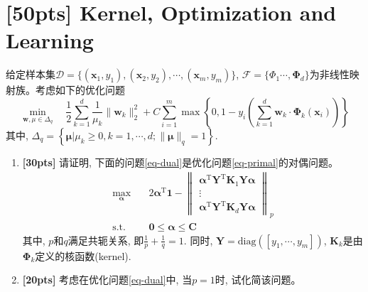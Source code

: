\documentclass[a4paper,UTF8]{article}
\numberwithin{equation}{section}
\theoremstyle{definition}
\begin{document}
\newpage
\section{[50pts] Kernel, Optimization and Learning}
给定样本集$\mathcal{D} = \{(\mathbf{x}_1,y_1),(\mathbf{x}_2,y_2),\cdots,(\mathbf{x}_m,y_m)\}$, $\mathcal{F} = \{\Phi_1 \cdots,\bm \Phi_d\}$为非线性映射族。考虑如下的优化问题
\begin{equation}
\label{eq-primal}
\min_{\mathbf w, \mu\in \Delta_q} \quad \frac{1}{2} \sum_{k=1}^d \frac{1}{\mu_k}\lVert\mathbf w_k\rVert_2^2 + C\sum_{i=1}^m \max\left\lbrace 0,1 - y_i\left(\sum_{k=1}^d \mathbf w_k \cdot \bm \Phi_k(\mathbf{x}_i)\right) \right\rbrace
\end{equation}
其中, $\Delta_q = \left\lbrace \bm{ \mu} | \mu_k\geq 0, k=1,\cdots,d; \lVert \bm{ \mu} \rVert_q = 1\right\rbrace$.

\begin{enumerate}[(1)]
\item{ \textbf{[30pts]} 请证明, 下面的问题\ref{eq-dual}是优化问题\ref{eq-primal}的对偶问题。
\begin{equation}
\label{eq-dual}
	\begin{split}
\max_{\bm \alpha} &\quad 2\bm \alpha^\mathrm T \mathbf{1}- \left\lVert
 \begin{matrix}
   \bm \alpha^\mathrm{T}\mathbf Y^\mathrm{T} \mathbf K_1 \mathbf Y  \bm \alpha \\
   \vdots \\
  \bm \alpha^\mathrm{T}\mathbf Y^\mathrm{T} \mathbf K_d \mathbf Y  \bm \alpha 
  \end{matrix}
  \right\rVert_p\\
  \text{s.t.} &\quad  \mathbf{0} \leq \bm \alpha  \leq \mathbf{C} 
  \end{split}
\end{equation}
其中, $p$和$q$满足共轭关系, 即$\frac{1}{p}+\frac{1}{q}=1$. 同时, $\mathbf Y = \text{diag}([y_1,\cdots,y_m])$, $\mathbf K_k$是由$\bm \Phi_k$定义的核函数(kernel).}
\item{ \textbf{[20pts]} 考虑在优化问题\ref{eq-dual}中, 当$p=1$时, 试化简该问题。}
\end{enumerate}
\end{document}
